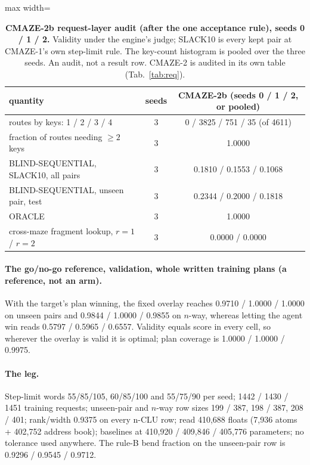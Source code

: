 \documentclass{article} %
\begin{document}
\begin{table}[h]
\centering\small
\caption{\textbf{CMAZE-2b request-layer audit (after the one acceptance rule), seeds 0 / 1 / 2.} %
Validity under the engine's judge; SLACK10 is every kept pair at CMAZE-1's own step-limit rule. The
key-count histogram is pooled over the three seeds. An audit, not a result row. CMAZE-2 is
audited in its own table (Tab.~\ref{tab:req}).}
\label{tab:req2b}
\setlength{\tabcolsep}{3pt}
\begin{adjustbox}{max width=\linewidth}\begin{tabular}{lcc}
\toprule
quantity & seeds & CMAZE-2b (seeds 0 / 1 / 2, or pooled) \\
\midrule
routes by keys: 1 / 2 / 3 / 4 & 3 & 0 / 3825 / 751 / 35 (of 4611) \\
fraction of routes needing $\ge2$ keys & 3 & 1.0000 \\
BLIND-SEQUENTIAL, SLACK10, all pairs & 3 & 0.1810 / 0.1553 / 0.1068 \\
BLIND-SEQUENTIAL, unseen pair, test & 3 & 0.2344 / 0.2000 / 0.1818 \\
ORACLE & 3 & 1.0000 \\
cross-maze fragment lookup, $r=1$ / $r=2$ & 3 & 0.0000 / 0.0000 \\
\bottomrule
\end{tabular}\end{adjustbox}
\end{table}



\paragraph{The go/no-go reference, validation, whole written training plans (a reference, not an
arm).} With the target's plan winning, the fixed overlay reaches 0.9710 / 1.0000 / 1.0000 on unseen
pairs and 0.9844 / 1.0000 / 0.9855 on $n$-way, whereas letting the agent win reads 0.5797 / 0.5965 /
0.6557. Validity equals score in every cell, so wherever the overlay is valid it is optimal; plan
coverage is 1.0000 / 1.0000 / 0.9975. %

\paragraph{The leg.} Step-limit words 55/85/105, 60/85/100 and 55/75/90 per seed; 1442 / 1430 / 1451
training requests; unseen-pair and $n$-way row sizes 199 / 387, 198 / 387, 208 / 401; rank/width
0.9375 on every n-CLU row; read 410,688 floats (7,936 atoms + 402,752 address book); baselines at
410,920 / 409,846 / 405,776 parameters; no tolerance used anywhere. The rule-B bend fraction on the
unseen-pair row is 0.9296 / 0.9545 / 0.9712. %
\end{document}
